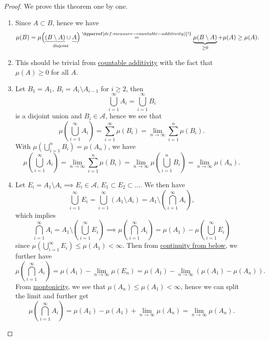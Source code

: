 \begin{proof}
	We prove this theorem one by one.
	\begin{enumerate}
		\item Since \(A\subset B\), hence we have
		      \[
			      \mu(B) = \mu\underset{\text{disjoint} }{\left(\underline{(B\setminus A)}\cup \underline{\vphantom{(B\setminus A)}A}\right)} \overset{\hyperref[def:measure-countable-additivity]{!}}{=} \underbrace{\mu(B\setminus A)}_{\geq 0} + \mu(A) \geq \mu(A).
		      \]
		\item This should be trivial from \hyperref[def:measure-countable-additivity]{countable additivity} with the fact that \(\mu(A)\geq 0\) for all \(A\). 
		\item Let \(B_1 = A_1\), \(B_{i} = A_{i} \setminus A_{i-1}\) for \(i\geq 2\), then
		      \[
			      \bigcup\limits_{i=1}^{\infty} A_{i} = \bigcup\limits_{i=1}^{\infty} B_{i}
		      \]
		      is a disjoint union and \(B_{i}\in \mathcal{A}\), hence we see that
		      \[
			      \mu\left(\bigcup\limits_{i=1}^{\infty} A_{i}\right) = \sum\limits_{i=1}^{\infty} \mu(B_{i}) = \lim\limits_{n \to \infty} \sum\limits_{i=1}^{n} \mu(B_{i}).
		      \]
		      With \(\mu\left(\bigcup\limits_{i=1}^{n} B_{i}\right) = \mu(A_{n})\), we have
		      \[
			      \mu\left(\bigcup\limits_{i=1}^{\infty} A_{i}\right) = \lim\limits_{n \to \infty} \sum\limits_{i=1}^{n} \mu(B_{i}) = \lim\limits_{n \to \infty} \mu\left(\bigcup\limits_{i=1}^{n} B_{i}\right) = \lim\limits_{n \to \infty} \mu(A_{n}).
		      \]
		\item Let \(E_{i} = A_{1} \setminus A_{i} \implies E_{i}\in \mathcal{A}\), \(E_1\subset E_2\subset \ldots\). We then have
		      \[
			      \bigcup\limits_{i=1}^{\infty} E_{i} = \bigcup\limits_{i=1}^{\infty} \left(A_1 \setminus A_{i}\right) = A_1 \setminus \left(\bigcap\limits_{i=1}^{\infty} A_{i}\right),
		      \]
		      which implies
		      \[
			      \bigcap\limits_{i=1}^{\infty} A_{i} = A_1 \setminus \left(\bigcup\limits_{i=1}^{\infty} E_{i}\right) \implies \mu\left(\bigcap\limits_{i=1}^{\infty} A_{i}\right) = \mu(A_1) - \mu\left(\bigcup\limits_{i=1}^{\infty} E_{i}\right)
		      \]
		      since \(\mu\left(\bigcup\limits_{i=1}^{\infty} E_{i}\right) \leq \mu(A_1) < \infty \). Then from \hyperref[thm:continuity-from-below]{continuity from below}, we further have
		      \[
			      \mu\left(\bigcap\limits_{i=1}^{\infty} A_{i}\right) = \mu(A_1) - \lim\limits_{n \to \infty} \mu(E_{n}) = \mu(A_1) - \lim\limits_{n \to \infty} \left(\mu(A_1) - \mu(A_{n})\right).
		      \]
		      From \hyperref[thm:montonicity]{montonicity}, we see that \(\mu(A_{n})\leq \mu(A_1) < \infty\), hence we can split the limit and further get
		      \[
			      \mu\left(\bigcap\limits_{i=1}^{\infty} A_{i}\right) = \mu(A_1) - \mu(A_1) + \lim\limits_{n \to \infty} \mu(A_{n}) = \lim\limits_{n \to \infty} \mu(A_{n}).
		      \]
	\end{enumerate}
\end{proof}

